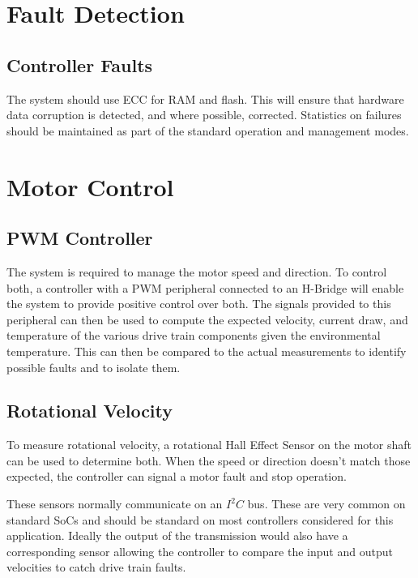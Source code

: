 \documentclass{article}
\begin{document}
\section{Fault Detection}

\subsection{Controller Faults}

The system should use ECC for RAM and flash. This will ensure that
hardware data corruption is detected, and where possible, corrected.
Statistics on failures should be maintained as part of the standard
operation and management modes.

\section{Motor Control}

\subsection{PWM Controller}

The system is required to manage the motor speed and direction.
To control both, a controller with a PWM peripheral connected to an
H-Bridge will enable the system to provide positive control over both.
The signals provided to this peripheral can then be used to compute
the expected velocity, current draw, and temperature of the various
drive train components given the environmental temperature. This can
then be compared to the actual measurements to identify possible
faults and to isolate them.

\subsection{Rotational Velocity}

To measure rotational velocity, a rotational Hall Effect Sensor on the
motor shaft can be used to determine both. When the speed or direction
doesn’t match those expected, the controller can signal a motor fault
and stop operation.

These sensors normally communicate on an $I^2C$ bus. These are very
common on standard SoCs and should be standard on most controllers
considered for this application. Ideally the output of the
transmission would also have a corresponding sensor allowing the
controller to compare the input and output velocities to catch drive
train faults.
\end{document}

